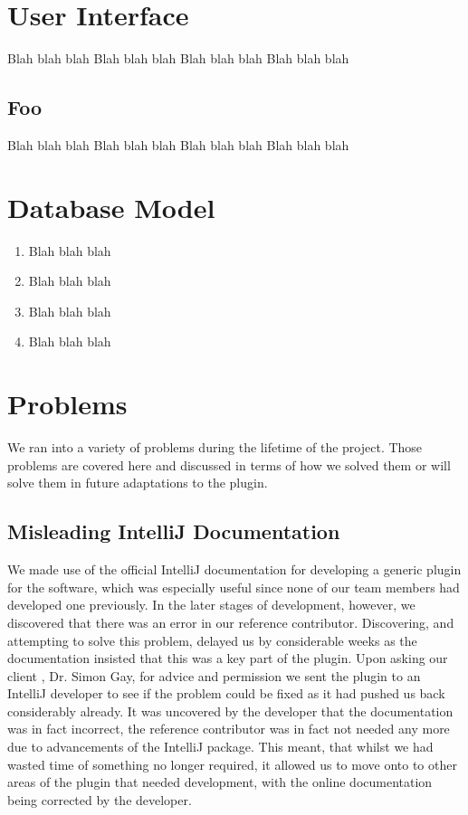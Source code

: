 \documentclass{l3proj}
\begin{document}
\section{User Interface}

Blah blah blah
Blah blah blah
Blah blah blah
Blah blah blah

\subsection{Foo}

Blah blah blah
Blah blah blah
Blah blah blah
Blah blah blah

\section{Database Model}

\begin{enumerate}
\item Blah blah blah
\item Blah blah blah
\item Blah blah blah
\item Blah blah blah
\end{enumerate}

\section{Problems}
We ran into a variety of problems during the lifetime of the project. Those problems are covered here and discussed in terms of how we solved them or will solve them in future adaptations to the plugin. 

\subsection {Misleading IntelliJ Documentation}
We made use of the official IntelliJ documentation for developing a generic plugin for the software, which was especially useful since none of our team members had developed one previously. In the later stages of development, however, we discovered that there was an error in our reference contributor. Discovering, and attempting to solve this problem, delayed us by considerable weeks as the documentation insisted that this was a key part of the plugin. Upon asking our client , Dr. Simon Gay, for advice and permission we sent the plugin to an IntelliJ developer to see if the problem could be fixed as it had pushed us back considerably already. It was uncovered by the developer that the documentation was in fact incorrect, the reference contributor was in fact not needed any more due to advancements of the IntelliJ package. This meant, that whilst we had wasted time of something no longer required, it allowed us to move onto to other areas of the plugin that needed development, with the online documentation being corrected by the developer. 
\end{document}
